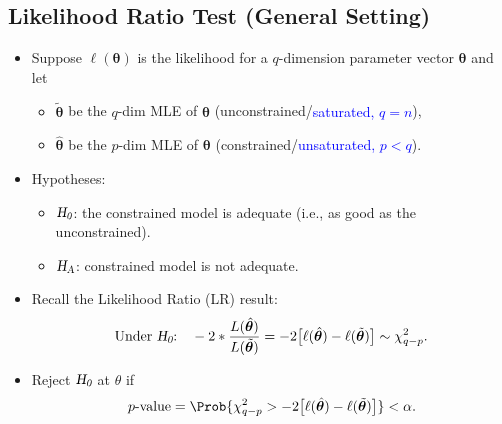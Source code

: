 \documentclass{article}\usepackage[]{graphicx}\usepackage[svgnames]{xcolor}
\let\log\relax%
\newcommand{\HN}{\textsl{H}_{\textsl{0}}}%
\newcommand{\HA}{\textsl{H}_{\textsl{A}}}%
\providecommand{\Vector}[1]{\bm{#1}}%
\begin{document}
\subsection*{Likelihood Ratio Test (General Setting)}
\begin{itemize}
      \item Suppose $ \ell(\Vector{\theta}) $ is the likelihood for a $ q $-dimension parameter vector $ \Vector{\theta} $ and let
            \begin{itemize}
                  \item $ \tilde{\Vector{\theta}} $ be the $ q $-dim MLE of $ \Vector{\theta} $ (unconstrained/\textcolor{Blue}{saturated, $ q=n $}),
                  \item $ \hat{\Vector{\theta}} $ be the $ p $-dim MLE of $ \Vector{\theta} $ (constrained/\textcolor{Blue}{unsaturated, $ p<q $}).
            \end{itemize}
      \item Hypotheses:
            \begin{itemize}
                  \item $ \HN $: the constrained model is adequate (i.e., as good as the unconstrained).
                  \item $ \HA $: constrained model is not adequate.
            \end{itemize}
      \item Recall the Likelihood Ratio (LR) result:
            \[ \text{Under $ \HN $:}\quad -2\log*{\frac{L(\hat{\Vector{\theta}})}{L(\tilde{\Vector{\theta}})}}
                  =-2\bigl[\ell(\hat{\Vector{\theta}})-\ell(\tilde{\Vector{\theta}})\bigr]\sim \chi^2_{q-p}. \]
      \item Reject $ \HN $ at $ \theta $ if
            \[ p\text{-value}=\Prob{\chi^2_{q-p}>-2\bigl[\ell(\hat{\Vector{\theta}})-\ell(\tilde{\Vector{\theta}})\bigr]}<\alpha. \]
\end{itemize}
\end{document}
